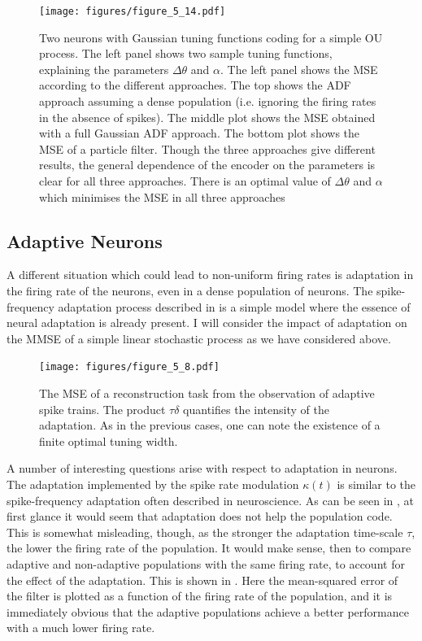 \begin{figure}
\texttt{[image: figures/figure\_5\_14.pdf]}
\caption[Optimal coding with two Gaussian neurons.]{Two neurons with Gaussian tuning functions coding for a simple OU process. The left panel shows two sample tuning functions, explaining the parameters $\Delta\theta$ and
$\alpha$. The left panel shows the MSE according to the different approaches. The top shows the ADF approach assuming a dense population (i.e. ignoring the firing rates in the 
absence of spikes). The middle plot shows the MSE obtained with a full Gaussian ADF approach. The bottom plot shows the MSE of a particle filter. Though the three approaches
give different results, the general dependence of the encoder on the parameters is clear for all three approaches. There is an optimal value of $\Delta\theta$ and $\alpha$
which minimises the MSE in all three approaches}
\label{fig:two_neurons}

\end{figure}

\subsection{Adaptive Neurons}

A different situation which could lead to non-uniform firing rates is adaptation in the firing rate of the neurons, even in a dense population of neurons. The spike-frequency adaptation
process described in  is a simple model where the essence of neural adaptation is already present. I will consider the impact of adaptation
on the MMSE of a simple linear stochastic process as we have considered above.\par

\begin{figure}
\label{fig:adaptive_mse}
\texttt{[image: figures/figure\_5\_8.pdf]}
\caption[MSE of a population of adaptive neurons.]{The MSE of a reconstruction task from the observation of adaptive spike trains. The product $\tau\delta$ quantifies the intensity of the adaptation. As in the previous cases,
one can note the existence of a finite optimal tuning width.}
\end{figure}

A number of interesting questions arise with respect to adaptation in neurons. The adaptation implemented by the spike rate modulation $\kappa(t)$ is similar to the
spike-frequency adaptation often described in neuroscience. As can be seen in , at first glance it
would seem that adaptation does not help the population code. This is somewhat misleading, though, as the stronger the adaptation time-scale $\tau$, the lower
the firing rate of the population. It would make sense, then to compare adaptive and non-adaptive populations with the same firing rate, to account for the effect of the
adaptation. This is shown in . Here the mean-squared error of the filter is plotted as a function of the firing rate of the population, and it
is immediately obvious that the adaptive populations achieve a better performance with a much lower firing rate.\par

